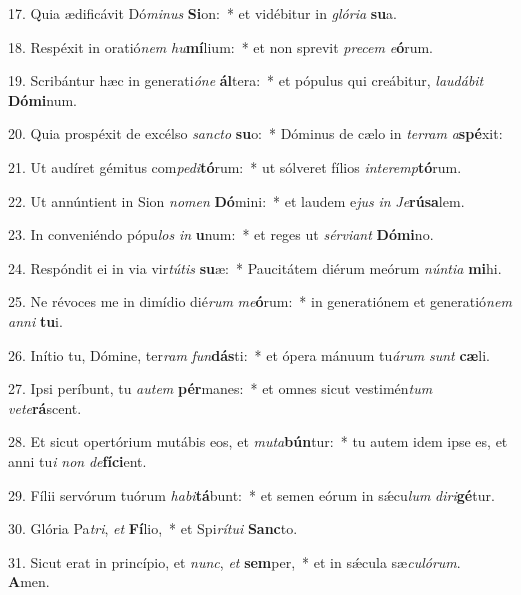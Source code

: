 17. Quia ædificávit Dó\textit{mi}\textit{nus} \textbf{Si}on:~*  et vidébitur in \textit{gló}\textit{ri}\textit{a} \textbf{su}a.\

18. Respéxit in oratió\textit{nem} \textit{hu}\textbf{mí}lium:~*  et non sprevit \textit{pre}\textit{cem} \textit{e}\textbf{ó}rum.\

19. Scribántur hæc in generati\textit{ó}\textit{ne} \textbf{ál}tera:~*  et pópulus qui creábitur, \textit{lau}\textit{dá}\textit{bit} \textbf{Dó}\textbf{mi}num.\

20. Quia prospéxit de excélso \textit{sanc}\textit{to} \textbf{su}o:~*  Dóminus de cælo in \textit{ter}\textit{ram} \textit{a}\textbf{spé}xit:\

21. Ut audíret gémitus com\textit{pe}\textit{di}\textbf{tó}rum:~*  ut sólveret fílios \textit{in}\textit{ter}\textit{emp}\textbf{tó}rum.\

22. Ut annúntient in Sion \textit{no}\textit{men} \textbf{Dó}mini:~*  et laudem e\textit{jus} \textit{in} \textit{Je}\textbf{rú}\textbf{sa}lem.\

23. In conveniéndo pópu\textit{los} \textit{in} \textbf{u}num:~*  et reges ut \textit{sér}\textit{vi}\textit{ant} \textbf{Dó}\textbf{mi}no.\

24. Respóndit ei in via vir\textit{tú}\textit{tis} \textbf{su}æ:~*  Paucitátem diérum meórum \textit{nún}\textit{ti}\textit{a} \textbf{mi}hi.\

25. Ne révoces me in dimídio dié\textit{rum} \textit{me}\textbf{ó}rum:~*  in generatiónem et generatió\textit{nem} \textit{an}\textit{ni} \textbf{tu}i.\

26. Inítio tu, Dómine, ter\textit{ram} \textit{fun}\textbf{dás}ti:~*  et ópera mánuum tu\textit{á}\textit{rum} \textit{sunt} \textbf{cæ}li.\

27. Ipsi períbunt, tu \textit{au}\textit{tem} \textbf{pér}manes:~*  et omnes sicut vestimén\textit{tum} \textit{ve}\textit{te}\textbf{rá}scent.\

28. Et sicut opertórium mutábis eos, et \textit{mu}\textit{ta}\textbf{bún}tur:~*  tu autem idem ipse es, et anni tu\textit{i} \textit{non} \textit{de}\textbf{fí}\textbf{ci}ent.\

29. Fílii servórum tuórum \textit{ha}\textit{bi}\textbf{tá}bunt:~*  et semen eórum in sǽcu\textit{lum} \textit{di}\textit{ri}\textbf{gé}tur.\

30. Glória Pa\textit{tri}, \textit{et} \textbf{Fí}lio,~*  et Spi\textit{rí}\textit{tu}\textit{i} \textbf{Sanc}to.\

31. Sicut erat in princípio, et \textit{nunc}, \textit{et} \textbf{sem}per,~*  et in sǽcula sæ\textit{cu}\textit{ló}\textit{rum}. \textbf{A}men.\

